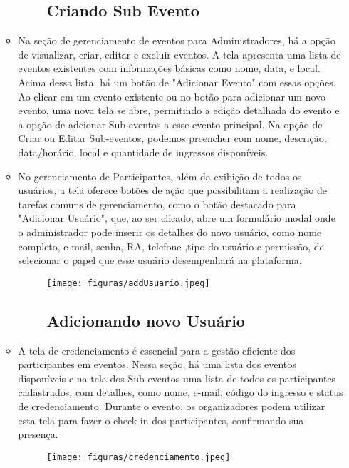 \begin{itemize}
\begin{itemize}
\begin{figure}[h!]
    \subsection{{Criando Sub Evento}}
    \label{fig:subEvento}
\end{figure}

\item Na seção de gerenciamento de eventos para Administradores, há a opção de visualizar, criar, editar e excluir eventos. A tela apresenta uma lista de eventos existentes com informações básicas como nome, data, e local. Acima dessa lista, há um botão de "Adicionar Evento" com essas opções. Ao clicar em um evento existente ou no botão para adicionar um novo evento, uma nova tela se abre, permitindo a edição detalhada do evento e a opção de adcionar Sub-eventos a esse evento principal. Na opção de Criar ou Editar Sub-eventos, podemos preencher com nome, descrição, data/horário, local e quantidade de ingressos disponíveis.

\item No gerenciamento de Participantes, além da exibição de todos os usuários, a tela oferece botões de ação que possibilitam a realização de tarefas comuns de gerenciamento, como o botão destacado para "Adicionar Usuário", que, ao ser clicado, abre um formulário modal onde o administrador pode inserir os detalhes do novo usuário, como nome completo, e-mail, senha, RA, telefone ,tipo do usuário e permissão, de selecionar o papel que esse usuário desempenhará na plataforma.

\begin{figure}[h!]
    \centering
    \texttt{[image: figuras/addUsuario.jpeg]}
    \subsection{{Adicionando novo Usuário}}
    \label{fig:credenciamento}
\end{figure}

\item A tela de credenciamento é essencial para a gestão eficiente dos participantes em eventos. Nessa seção, há uma lista dos eventos disponíveis e na tela dos Sub-eventos uma lista de todos os participantes cadastrados, com detalhes, como nome, e-mail, código do ingresso e status de credenciamento. Durante o evento, os organizadores podem utilizar esta tela para fazer o check-in dos participantes, confirmando sua presença.

\begin{figure}[h!]
    \centering
    \texttt{[image: figuras/credenciamento.jpeg]}

\end{figure}
\end{itemize}
\end{itemize}
